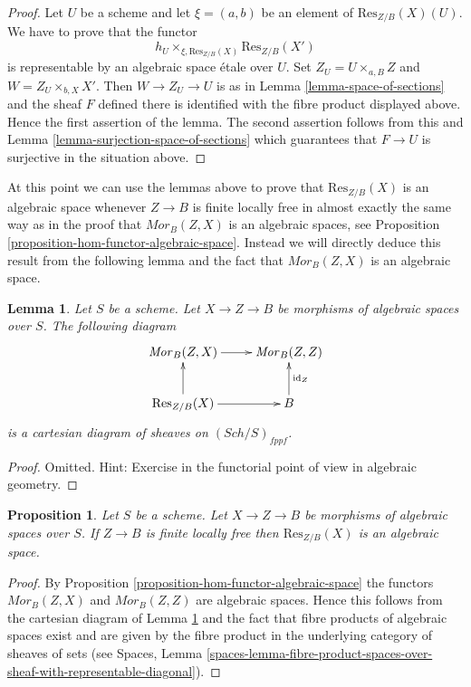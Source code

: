 \documentclass{stacks-project}
\theoremstyle{plain}
\newtheorem{proposition}[subsection]{Proposition}
\newtheorem{lemma}[subsection]{Lemma}
\theoremstyle{definition}
\theoremstyle{remark}
\numberwithin{equation}{subsection}
\def\Sch{\mathit{Sch}}
\begin{document}
\begin{proof}
Let $U$ be a scheme and let $\xi = (a, b)$ be an element of
$\text{Res}_{Z/B}(X)(U)$. We have to prove that the functor
$$
h_U \times_{\xi, \text{Res}_{Z/B}(X)} \text{Res}_{Z/B}(X')
$$
is representable by an algebraic space \'etale over $U$. Set
$Z_U = U \times_{a, B} Z$ and $W = Z_U \times_{b, X} X'$.
Then $W \to Z_U \to U$ is as in
Lemma \ref{lemma-space-of-sections}
and the sheaf $F$ defined there is identified with the fibre product
displayed above. Hence the first assertion of the lemma.
The second assertion follows from this and
Lemma \ref{lemma-surjection-space-of-sections}
which guarantees that $F \to U$ is surjective in the situation above.
\end{proof}

\noindent
At this point we can use the lemmas above to prove that $\text{Res}_{Z/B}(X)$
is an algebraic space whenever $Z \to B$ is finite locally free in almost
exactly the same way as in the proof that $\mathit{Mor}_B(Z, X)$ is an
algebraic spaces, see
Proposition \ref{proposition-hom-functor-algebraic-space}.
Instead we will directly deduce this result from the following lemma
and the fact that $\mathit{Mor}_B(Z, X)$ is an algebraic space.

\begin{lemma}
\label{lemma-fibre-diagram}
Let $S$ be a scheme. Let $X \to Z \to B$ be morphisms of
algebraic spaces over $S$. The following diagram
$$
\xymatrix{
\mathit{Mor}_B(Z, X) \ar[r] & \mathit{Mor}_B(Z, Z) \\
\text{Res}_{Z/B}(X) \ar[r] \ar[u] & B \ar[u]_{\text{id}_Z}
}
$$
is a cartesian diagram of sheaves on $(\Sch/S)_{fppf}$.
\end{lemma}

\begin{proof}
Omitted. Hint: Exercise in the functorial point of view in algebraic
geometry.
\end{proof}

\begin{proposition}
\label{proposition-restriction-of-scalars-algebraic-space}
Let $S$ be a scheme. Let $X \to Z \to B$ be morphisms of
algebraic spaces over $S$. If $Z \to B$ is finite locally free
then $\text{Res}_{Z/B}(X)$ is an algebraic space.
\end{proposition}

\begin{proof}
By
Proposition \ref{proposition-hom-functor-algebraic-space}
the functors $\mathit{Mor}_B(Z, X)$ and $\mathit{Mor}_B(Z, Z)$
are algebraic spaces. Hence this follows from the cartesian
diagram of
Lemma \ref{lemma-fibre-diagram}
and the fact that fibre products of algebraic spaces exist and
are given by the fibre product in the underlying category of
sheaves of sets (see
Spaces, Lemma
\ref{spaces-lemma-fibre-product-spaces-over-sheaf-with-representable-diagonal}).
\end{proof}
\end{document}
